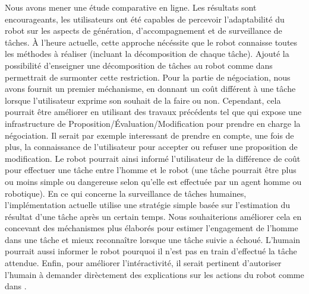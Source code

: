 \documentclass[a4paper,11pt,twoside]{StyleThese}
\begin{document}
Nous avons mener une étude comparative en ligne. Les résultats sont encourageants, les utilisateurs ont été capables de percevoir l'adaptabilité du robot sur les aspects de génération, d'accompagnement et de surveillance de tâches.
%
À l'heure actuelle, cette approche nécéssite que le robot connaisse toutes les méthodes à réaliser (incluant la décomposition de chaque tâche). Ajouté la possibilité d'enseigner une décomposition de tâches au robot comme dans  \cite{Mohseni2015} permettrait de surmonter cette restriction.
Pour la partie de négociation, nous avons fournit un premier méchanisme, en donnant un coût différent à une tâche lorsque l'utilisateur exprime son souhait de la faire ou non. Cependant, cela pourrait être améliorer en utilisant des travaux précédents tel que \cite{chu2000conflict} qui expose une infrastructure de Proposition/Évaluation/Modification pour prendre en charge la négociation.
Il serait par exemple interessant de prendre en compte, une fois de plus, la connaissance de l'utilisateur pour accepter ou refuser une proposition de modification. Le robot pourrait ainsi informé l'utilisateur de la différence de coût pour effectuer une tâche entre l'homme et le robot (une tâche pourrait être plus ou moins simple ou dangereuse selon qu'elle est effectuée par un agent homme ou robotique).
En ce qui concerne la surveillance de tâches humaines, l'implémentation actuelle utilise une stratégie simple basée sur l'estimation du résultat d'une tâche après un certain temps. Nous souhaiterions améliorer cela en concevant des méchanismes plus élaborés pour estimer l'engagement de l'homme dans une tâche et mieux reconnaître lorsque une tâche suivie a échoué. L'humain pourrait aussi informer le robot pourquoi il n'est pas en train d'effectué la tâche attendue.
Enfin, pour améliorer l'intéractivité, il serait pertinent d'autoriser l'humain à demander dirèctement des explications sur les actions du robot comme dans  \cite{Lomas2012}.



\ifdefined{}
\else


\end{document}
